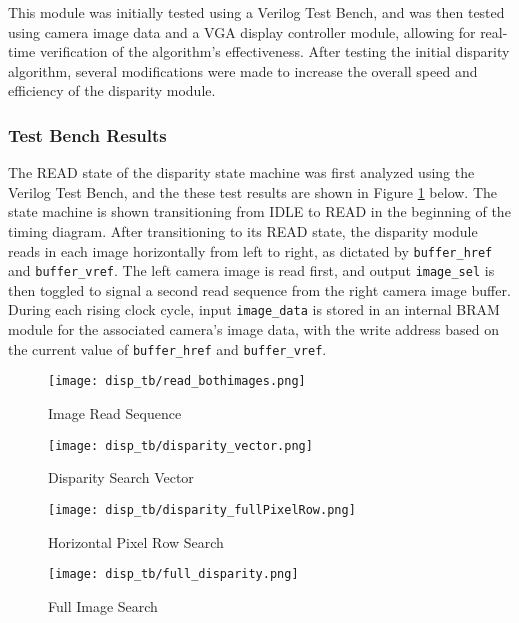\par
This module was initially tested using a Verilog Test Bench, and was then tested using camera image data and a VGA display controller module, allowing for real-time verification of the algorithm's effectiveness. After testing the initial disparity algorithm, several modifications were made to increase the overall speed and efficiency of the disparity module. 
\subsubsection{Test Bench Results}
The READ state of the disparity state machine was first analyzed using the Verilog Test Bench, and the these test results are shown in Figure \ref{disparityImgRead} below. The state machine is shown transitioning from IDLE to READ in the beginning of the timing diagram. After transitioning to its READ state, the disparity module reads in each image horizontally from left to right, as dictated by \texttt{buffer\_href} and \texttt{buffer\_vref}. The left camera image is read first, and output \texttt{image\_sel} is then toggled to signal a second read sequence from the right camera image buffer. During each rising clock cycle, input \texttt{image\_data} is stored in an internal BRAM module for the associated camera's image data, with the write address based on the current value of \texttt{buffer\_href} and \texttt{buffer\_vref}. 

\par
\begin{figure}[H]
	\centerline{\texttt{[image: disp\_tb/read\_bothimages.png]}}
	\caption{Image Read Sequence}
	\label{disparityImgRead}
\end{figure}
\par

\begin{figure}[H]
	\centerline{\texttt{[image: disp\_tb/disparity\_vector.png]}}
	\caption{Disparity Search Vector}
	\label{disparityVector}
\end{figure}

\begin{figure}[H]
	\centerline{\texttt{[image: disp\_tb/disparity\_fullPixelRow.png]}}
	\caption{Horizontal Pixel Row Search}
	\label{disparityRowSearch}
\end{figure}

\begin{figure}[H]
	\centerline{\texttt{[image: disp\_tb/full\_disparity.png]}}
	\caption{Full Image Search}
	\label{disparityFullSearch}
\end{figure}


